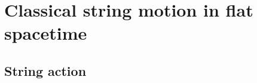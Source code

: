 \chapter{Classical string motion in flat spacetime}
\setcounter{page}{1}


\section{String action}

